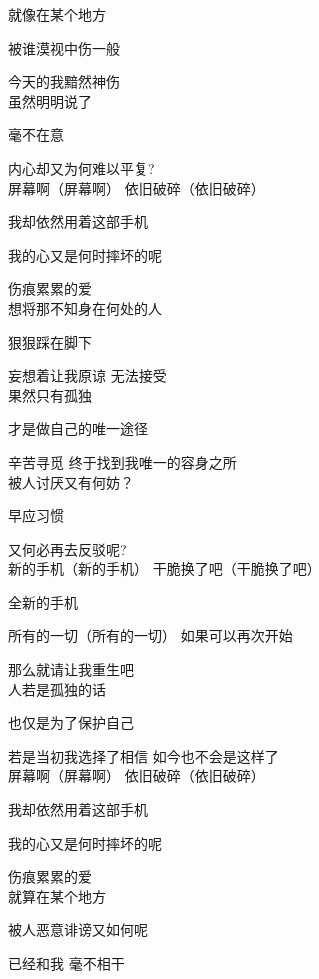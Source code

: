 就像在某个地方

被谁漠视中伤一般

今天的我黯然神伤
\\

虽然明明说了

毫不在意

内心却又为何难以平复?
\\

屏幕啊（屏幕啊） 依旧破碎（依旧破碎）

我却依然用着这部手机

我的心又是何时摔坏的呢

伤痕累累的爱
\\

想将那不知身在何处的人

狠狠踩在脚下

妄想着让我原谅 无法接受
\\

果然只有孤独

才是做自己的唯一途径

辛苦寻觅 终于找到我唯一的容身之所
\\

被人讨厌又有何妨？

早应习惯

又何必再去反驳呢?
\\

新的手机（新的手机） 干脆换了吧（干脆换了吧）

全新的手机

所有的一切（所有的一切） 如果可以再次开始

那么就请让我重生吧
\\

人若是孤独的话

也仅是为了保护自己

若是当初我选择了相信 如今也不会是这样了
\\

屏幕啊（屏幕啊） 依旧破碎（依旧破碎）

我却依然用着这部手机

我的心又是何时摔坏的呢

伤痕累累的爱
\\

就算在某个地方

被人恶意诽谤又如何呢

已经和我 毫不相干
\\
